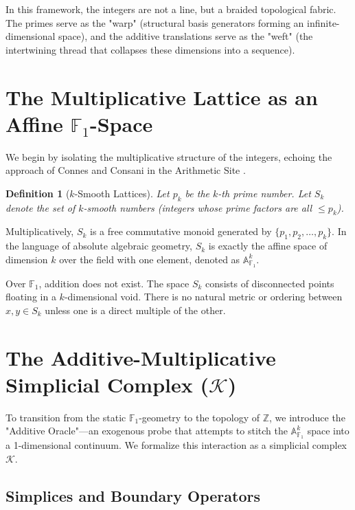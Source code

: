 \documentclass[11pt, a4paper]{article}
\newtheorem{definition}[theorem]{Definition}
\begin{document}
In this framework, the integers are not a line, but a braided topological fabric. The primes serve as the "warp" (structural basis generators forming an infinite-dimensional space), and the additive translations serve as the "weft" (the intertwining thread that collapses these dimensions into a sequence).

\section{The Multiplicative Lattice as an Affine $\mathbb{F}_1$-Space}

We begin by isolating the multiplicative structure of the integers, echoing the approach of Connes and Consani in the Arithmetic Site \cite{Connes2014}.

\begin{definition}[$k$-Smooth Lattices]
Let $p_k$ be the $k$-th prime number. Let $S_k$ denote the set of $k$-smooth numbers (integers whose prime factors are all $\leq p_k$). 
\end{definition}

Multiplicatively, $S_k$ is a free commutative monoid generated by $\{p_1, p_2, \dots, p_k\}$. In the language of absolute algebraic geometry, $S_k$ is exactly the affine space of dimension $k$ over the field with one element, denoted as $\mathbb{A}^k_{\mathbb{F}_1}$.

Over $\mathbb{F}_1$, addition does not exist. The space $S_k$ consists of disconnected points floating in a $k$-dimensional void. There is no natural metric or ordering between $x, y \in S_k$ unless one is a direct multiple of the other.

\section{The Additive-Multiplicative Simplicial Complex ($\mathcal{K}$)}

To transition from the static $\mathbb{F}_1$-geometry to the topology of $\mathbb{Z}$, we introduce the "Additive Oracle"—an exogenous probe that attempts to stitch the $\mathbb{A}^k_{\mathbb{F}_1}$ space into a 1-dimensional continuum. We formalize this interaction as a simplicial complex $\mathcal{K}$.

\subsection{Simplices and Boundary Operators}
\end{document}
